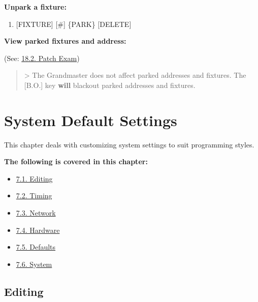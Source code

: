 \documentclass[
]{article}
\providecommand{\tightlist}{%
  \setlength{\itemsep}{0pt}\setlength{\parskip}{0pt}}
\begin{document}
\textbf{Unpark a fixture:}

\begin{enumerate}
\def\labelenumi{\arabic{enumi}.}
\tightlist
\item
  {[}FIXTURE{]} {[}\#{]} \{PARK\} {[}DELETE{]}
\end{enumerate}

\textbf{View parked fixtures and address:}

(See: \href{https://vibemanual.compulite.com/exam-show-data.html\#patch-exam}{18.2. Patch Exam})

\begin{quote}
{\textgreater{} The Grandmaster does not affect parked addresses and fixtures. The {[}B.O.{]} key \textbf{will} blackout parked addresses and fixtures.}
\end{quote}

\hypertarget{system-default-settings}{%
\section{System Default Settings}\label{system-default-settings}}

This chapter deals with customizing system settings to suit programming styles.

\textbf{The following is covered in this chapter:}

\begin{itemize}
\tightlist
\item
  \href{https://vibemanual.compulite.com/system-default-settings.html\#editing}{7.1. Editing}
\item
  \href{https://vibemanual.compulite.com/system-default-settings.html\#timing}{7.2. Timing}
\item
  \href{https://vibemanual.compulite.com/system-default-settings.html\#network}{7.3. Network}
\item
  \href{https://vibemanual.compulite.com/system-default-settings.html\#hardware}{7.4. Hardware}
\item
  \href{https://vibemanual.compulite.com/system-default-settings.html\#defaults}{7.5. Defaults}
\item
  \href{https://vibemanual.compulite.com/system-default-settings.html\#system}{7.6. System}
\end{itemize}

\hypertarget{editing}{%
\subsection{Editing}\label{editing}}
\end{document}

